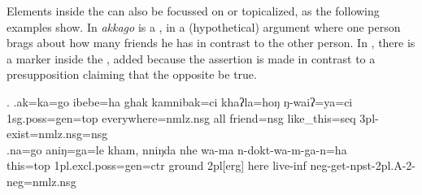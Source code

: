 Elements inside the  can also be focussed on or topicalized, as the following examples show. In \Next[a] \emph{akkago}  is a , in a (hypothetical) argument where one person brags about how many friends he has in contrast to the other person. In \Next[b], there is a  marker inside the , added because the assertion is made in contrast to a presupposition claiming that the opposite be true.
  
  \ex. \ag.ak=ka=go              ibebe=ha            ghak kamnibak=ci    khaʔla=hoŋ       ŋ-waiʔ=ya=ci\\
  {\sc 1sg.poss=gen=top} everywhere{\sc =nmlz.nsg} all friend{\sc =nsg} like\_this{\sc =seq} {\sc 3pl-}exist{\sc [npst]=nmlz.nsg=nsg}\\
   
  \bg.na=go       aniŋ=ga=le                     kham, nniŋda  nhe  wa-ma      n-dokt-wa-m-ga-n=ha\\
 this{\sc =top} {\sc 1pl.excl.poss=gen=ctr} ground {\sc 2pl[erg]} here live{\sc -inf} {\sc neg-}get{\sc-npst-2pl.A-2-neg=nmlz.nsg}\\
   
 

 
